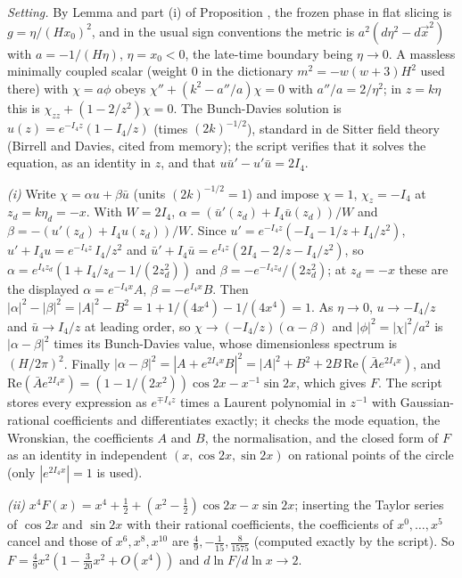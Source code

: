 \emph{Setting.} By Lemma  and part (i) of Proposition , the frozen phase in flat slicing is $g = \eta/(Hx_0)^{2}$, and in the usual sign conventions the metric is $a^{2}(d\eta^{2} - d\vec x^{2})$ with $a = -1/(H\eta)$, $\eta = x_0 < 0$, the late-time boundary being $\eta \to 0$. A massless minimally coupled scalar (weight $0$ in the dictionary $m^{2} = -w(w + 3)H^{2}$ used there) with $\chi = a\phi$ obeys $\chi'' + (k^{2} - a''/a)\chi = 0$ with $a''/a = 2/\eta^{2}$; in $z = k\eta$ this is $\chi_{zz} + (1 - 2/z^{2})\chi = 0$. The Bunch-Davies solution is $u(z) = e^{-I_{4} z}(1 - I_{4}/z)$ (times $(2k)^{-1/2}$), standard in de Sitter field theory (Birrell and Davies, cited from memory); the script verifies that it solves the equation, as an identity in $z$, and that $u\bar u' - u'\bar u = 2I_{4}$.

\emph{(i)} Write $\chi = \alpha u + \beta\bar u$ (units $(2k)^{-1/2} = 1$) and impose $\chi = 1$, $\chi_z = -I_{4}$ at $z_d = k\eta_d = -x$. With $W = 2I_{4}$, $\alpha = (\bar u'(z_d) + I_{4}\bar u(z_d))/W$ and $\beta = -(u'(z_d) + I_{4} u(z_d))/W$. Since $u' = e^{-I_{4} z}(-I_{4} - 1/z + I_{4}/z^{2})$, $u' + I_{4} u = e^{-I_{4} z}\,I_{4}/z^{2}$ and $\bar u' + I_{4}\bar u = e^{I_{4} z}(2I_{4} - 2/z - I_{4}/z^{2})$, so $\alpha = e^{I_{4} z_d}(1 + I_{4}/z_d - 1/(2z_d^{2}))$ and $\beta = -e^{-I_{4} z_d}/(2z_d^{2})$; at $z_d = -x$ these are the displayed $\alpha = e^{-I_{4} x}A$, $\beta = -e^{I_{4} x}B$. Then $|\alpha|^{2} - |\beta|^{2} = |A|^{2} - B^{2} = 1 + 1/(4x^{4}) - 1/(4x^{4}) = 1$. As $\eta \to 0$, $u \to -I_{4}/z$ and $\bar u \to I_{4}/z$ at leading order, so $\chi \to (-I_{4}/z)(\alpha - \beta)$ and $|\phi|^{2} = |\chi|^{2}/a^{2}$ is $|\alpha - \beta|^{2}$ times its Bunch-Davies value, whose dimensionless spectrum is $(H/2\pi)^{2}$. Finally $|\alpha - \beta|^{2} = |A + e^{2I_{4} x}B|^{2} = |A|^{2} + B^{2} + 2B\,\mathrm{Re}(\bar A e^{2I_{4} x})$, and $\mathrm{Re}(\bar Ae^{2I_{4} x}) = (1 - 1/(2x^{2}))\cos 2x - x^{-1}\sin 2x$, which gives $F$. The script stores every expression as $e^{\mp I_{4} z}$ times a Laurent polynomial in $z^{-1}$ with Gaussian-rational coefficients and differentiates exactly; it checks the mode equation, the Wronskian, the coefficients $A$ and $B$, the normalisation, and the closed form of $F$ as an identity in independent $(x, \cos 2x, \sin 2x)$ on rational points of the circle (only $|e^{2I_{4} x}| = 1$ is used).

\emph{(ii)} $x^{4}F(x) = x^{4} + \tfrac12 + (x^{2} - \tfrac12)\cos 2x - x\sin 2x$; inserting the Taylor series of $\cos 2x$ and $\sin 2x$ with their rational coefficients, the coefficients of $x^{0}, \dots, x^{5}$ cancel and those of $x^{6}, x^{8}, x^{10}$ are $\tfrac49, -\tfrac1{15}, \tfrac{8}{1575}$ (computed exactly by the script). So $F = \tfrac49 x^{2}(1 - \tfrac{3}{20}x^{2} + O(x^{4}))$ and $d\ln F/d\ln x \to 2$.

